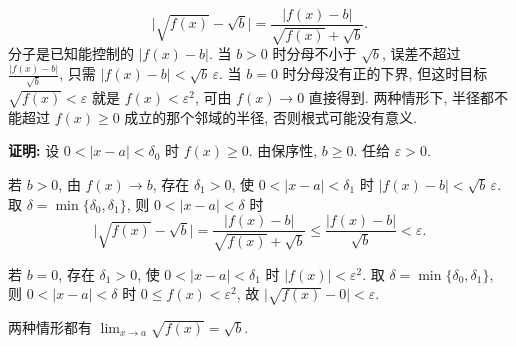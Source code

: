 \documentclass[UTF8,openany]{ctexbook}
\theoremstyle{chinesetextbook}
\newenvironment{cnproof}{\par\indent\textbf{证明:} \ignorespaces}{\par}
\begin{document}
\[
\bigl|\sqrt{f(x)}-\sqrt b\bigr|=\frac{|f(x)-b|}{\sqrt{f(x)}+\sqrt b}.
\]
分子是已知能控制的 $|f(x)-b|$. 当 $b>0$ 时分母不小于 $\sqrt b$, 误差不超过 $\displaystyle\frac{|f(x)-b|}{\sqrt b}$, 只需 $|f(x)-b|<\sqrt b\,\varepsilon$. 当 $b=0$ 时分母没有正的下界, 但这时目标 $\sqrt{f(x)}<\varepsilon$ 就是 $f(x)<\varepsilon^2$, 可由 $f(x)\to0$ 直接得到. 两种情形下, 半径都不能超过 $f(x)\ge0$ 成立的那个邻域的半径, 否则根式可能没有意义.
\begin{cnproof}
设 $0<|x-a|<\delta_0$ 时 $f(x)\ge0$. 由保序性, $b\ge0$. 任给 $\varepsilon>0$.

若 $b>0$, 由 $f(x)\to b$, 存在 $\delta_1>0$, 使 $0<|x-a|<\delta_1$ 时 $|f(x)-b|<\sqrt b\,\varepsilon$. 取 $\delta=\min\{\delta_0,\delta_1\}$, 则 $0<|x-a|<\delta$ 时
\[
\bigl|\sqrt{f(x)}-\sqrt b\bigr|=\frac{|f(x)-b|}{\sqrt{f(x)}+\sqrt b}\le\frac{|f(x)-b|}{\sqrt b}<\varepsilon.
\]

若 $b=0$, 存在 $\delta_1>0$, 使 $0<|x-a|<\delta_1$ 时 $|f(x)|<\varepsilon^2$. 取 $\delta=\min\{\delta_0,\delta_1\}$, 则 $0<|x-a|<\delta$ 时 $0\le f(x)<\varepsilon^2$, 故 $\bigl|\sqrt{f(x)}-0\bigr|<\varepsilon$.

两种情形都有 $\displaystyle\lim_{x\to a}\sqrt{f(x)}=\sqrt b$.
\end{cnproof}
\end{document}
